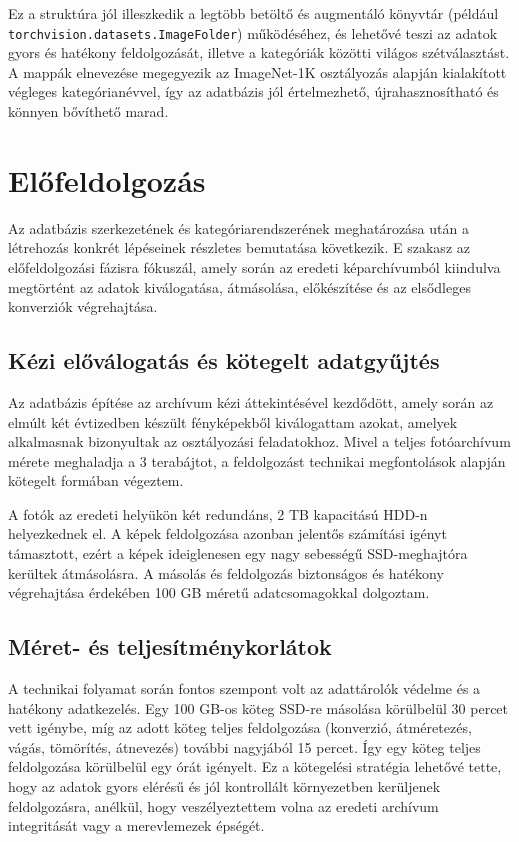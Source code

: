             Ez a struktúra jól illeszkedik a legtöbb betöltő és augmentáló könyvtár (például \texttt{torchvision.datasets.ImageFolder}) működéséhez, és lehetővé teszi az adatok gyors és hatékony feldolgozását, illetve a kategóriák közötti világos szétválasztást. A mappák elnevezése megegyezik az ImageNet-1K osztályozás alapján kialakított végleges kategórianévvel, így az adatbázis jól értelmezhető, újrahasznosítható és könnyen bővíthető marad.

    \section{Előfeldolgozás}

        Az adatbázis szerkezetének és kategóriarendszerének meghatározása után a létrehozás konkrét lépéseinek részletes bemutatása következik. E szakasz az előfeldolgozási fázisra fókuszál, amely során az eredeti képarchívumból kiindulva megtörtént az adatok kiválogatása, átmásolása, előkészítése és az elsődleges konverziók végrehajtása.

        \subsection{Kézi előválogatás és kötegelt adatgyűjtés}

        Az adatbázis építése az archívum kézi áttekintésével kezdődött, amely során az elmúlt két évtizedben készült fényképekből kiválogattam azokat, amelyek alkalmasnak bizonyultak az osztályozási feladatokhoz. Mivel a teljes fotóarchívum mérete meghaladja a 3 terabájtot, a feldolgozást technikai megfontolások alapján kötegelt formában végeztem.

        A fotók az eredeti helyükön két redundáns, 2 TB kapacitású HDD-n helyezkednek el. A képek feldolgozása azonban jelentős számítási igényt támasztott, ezért a képek ideiglenesen egy nagy sebességű SSD-meghajtóra kerültek átmásolásra. A másolás és feldolgozás biztonságos és hatékony végrehajtása érdekében 100 GB méretű adatcsomagokkal dolgoztam.

        \subsection{Méret- és teljesítménykorlátok}

        A technikai folyamat során fontos szempont volt az adattárolók védelme és a hatékony adatkezelés. Egy 100 GB-os köteg SSD-re másolása körülbelül 30 percet vett igénybe, míg az adott köteg teljes feldolgozása (konverzió, átméretezés, vágás, tömörítés, átnevezés) további nagyjából 15 percet. Így egy köteg teljes feldolgozása körülbelül egy órát igényelt. Ez a kötegelési stratégia lehetővé tette, hogy az adatok gyors elérésű és jól kontrollált környezetben kerüljenek feldolgozásra, anélkül, hogy veszélyeztettem volna az eredeti archívum integritását vagy a merevlemezek épségét.

